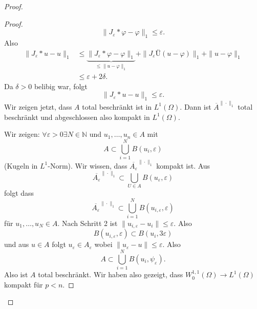 \documentclass[
paper=a4,
bibtotocnumbered,
liststotocnumbered,
tablecaptionabove,
pointlessnumbers,
twoside,
openright,
10pt
]
{report}
\let\phi\varphi
\theoremstyle{definition}
\numberwithin{equation}{chapter}
\begin{document}
\begin{proof}
\begin{proof}
\begin{equation}
 \|J_\varepsilon* \phi - \phi \|_1 \le \varepsilon.
\end{equation}
Also 
\begin{align*}
 \| J_\varepsilon*u -u\|_1 &\le \underbrace{\|J_\varepsilon * \phi - \phi\|_1}_{\le \|u-\phi\|_1} + \| J_\varepsilon Ü (u-\phi)\|_1 + \| u-\phi\|_1\\
 &\le \varepsilon + 2\delta.
\end{align*}
Da $\delta >0$ belibig war, folgt
\begin{equation}
 \| J_\varepsilon * u - u \|_1 \le \varepsilon.
\end{equation}
Wir zeigen jetzt, dass $A$ total beschränkt ist in $L^1(\Omega)$. Dann ist $\overline{A}^{\|\cdot\|_1}$ total beschränkt und abgeschlossen also kompakt in $L^1(\Omega)$.

Wir zeigen: $\forall \varepsilon >0 \exists N \in \mathbb N$ und $u_1, \ldots, u_n \in A$ mit
\begin{equation}
 A \subset \bigcup_{i=1}^N B(u_i, \varepsilon)
\end{equation}
(Kugeln in $L^1$-Norm). Wir wissen, dass $\overline{A_\varepsilon}^{\|\cdot \|_1}$ kompakt ist. Aus
\begin{equation}
 \overline{A_\varepsilon}^{\|\cdot\|_1} \subset\bigcup_{U\in A} B(u_\varepsilon, \varepsilon)
\end{equation}
folgt dass
\begin{equation}
 \overline{A_\varepsilon}^{\|\cdot \|_1} \subset \bigcup_{i=1}^N B(u_{i,\varepsilon}, \varepsilon)
\end{equation}
für $u_1,\ldots, u_N \in A$. Nach Schritt 2 ist $\| u_{i,\varepsilon} - u_i \| \le \varepsilon$. Also
\begin{equation}
 B(u_{i,\varepsilon}, \varepsilon) \subset B(u_i, 3\varepsilon)
\end{equation}
und aus $u\in A$ folgt $u_\varepsilon \in A_\varepsilon$ wobei $\| u_\varepsilon - u\| \le \varepsilon$. Also
\begin{equation}
 A\subset \bigcup_{i=1}^N B(u_i, \psi_\varepsilon).
\end{equation}
Also ist $A$ total beschränkt. Wir haben also gezeigt, dass $W_0^{1,1}(\Omega) \to L^1(\Omega)$ kompakt für $p<n$.
\end{proof}


\end{proof}
\end{document}
